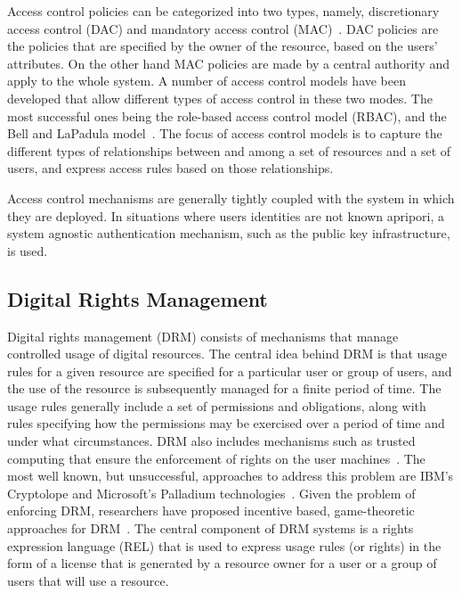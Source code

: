 Access control policies can be categorized into two types, namely, discretionary access control (DAC) and mandatory access control (MAC)~\cite{HuFeKu:06}. DAC policies are  the policies that are specified by the owner of the resource, based on the users' attributes. On the other hand MAC policies are made by a central authority and apply to the whole system.  A number of access control models have been developed that allow different types of access control in these two modes. The most successful ones being the role-based access control model (RBAC), and the Bell and LaPadula model~\cite{BL:73,BL:76}. The focus of access control models is to capture the different types of relationships between and among a set of resources and a set of users, and express access rules based on those relationships. 

Access control mechanisms are generally tightly coupled with the system in which they are deployed. In situations where users identities are not known apripori, a system agnostic authentication mechanism, such as the public key infrastructure, is used. 

\subsection{Digital Rights Management}
Digital rights management (DRM) consists of mechanisms that manage controlled usage of digital resources. The central idea behind DRM is that usage rules for a given resource are specified for a particular user or group of users, and the use of the resource is subsequently managed for a finite period of time.  The usage rules generally include a set of permissions and obligations, along with rules specifying how the permissions may be exercised over a period of time and under what circumstances. DRM also includes mechanisms such as trusted computing that ensure the enforcement of rights on the user machines~\cite{SaSt:04}. The most well known, but unsuccessful, approaches to address this problem are IBM's Cryptolope and Microsoft's Palladium technologies~\cite{CaJuPoLe:02,IBM:02,KoLoKa:97}.  Given the problem of enforcing DRM, researchers have proposed incentive based, game-theoretic approaches for DRM~\cite{HeJaKhHr:07,ZhPeMaYaHa:09}. The central component of DRM systems is a rights expression language (REL) that is used to express usage rules (or rights) in the form of a license that is generated by a resource owner for a user or a group of users that will use a resource.  

